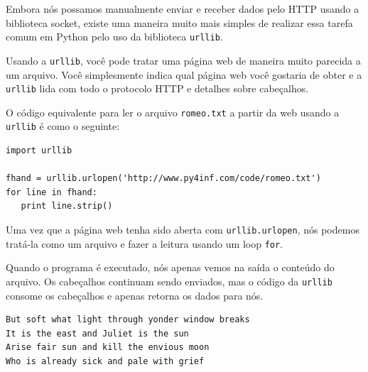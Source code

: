 Embora nós possamos manualmente enviar e receber dados pelo HTTP 
usando a biblioteca socket, existe uma maneira muito mais simples
de realizar essa tarefa comum em Python pelo uso da biblioteca
{\tt urllib}.

Usando a {\tt urllib}, você pode tratar uma página web de maneira muito
parecida a um arquivo. Você simplesmente indica qual página web você
gostaria de obter e a {\tt urllib} lida com todo o protocolo HTTP e detalhes
sobre cabeçalhos.

O código equivalente para ler o arquivo {\tt romeo.txt} a partir da web usando
a {\tt urllib} é como o seguinte:

\beforeverb
\begin{verbatim}
import urllib

fhand = urllib.urlopen('http://www.py4inf.com/code/romeo.txt')
for line in fhand:
   print line.strip()
\end{verbatim}
\afterverb

Uma vez que a página web tenha sido aberta com {\tt urllib.urlopen}, nós
podemos tratá-la como um arquivo e fazer a leitura usando um loop {\tt for}.

Quando o programa é executado, nós apenas vemos na saída o conteúdo do arquivo.
Os cabeçalhos continuam sendo enviados, mas o código da {\tt urllib} consome
os cabeçalhos e apenas retorna os dados para nós.

\beforeverb
\begin{verbatim}
But soft what light through yonder window breaks
It is the east and Juliet is the sun
Arise fair sun and kill the envious moon
Who is already sick and pale with grief
\end{verbatim}
\afterverb

